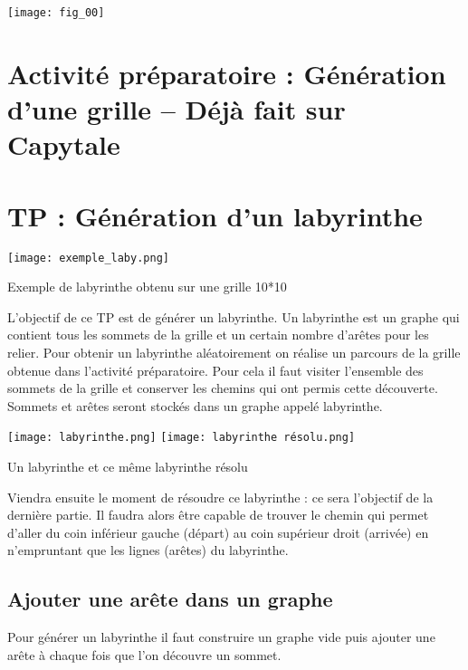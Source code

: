 \begin{marginfigure}
\texttt{[image: fig\_00]}
\end{marginfigure}

\section*{Activité préparatoire : Génération d'une grille -- Déjà fait sur Capytale}


\section*{TP : Génération d'un labyrinthe}

\begin{marginfigure}
\texttt{[image: exemple\_laby.png]}
\caption{Exemple de labyrinthe obtenu sur une grille 10*10}
\end{marginfigure}


L'objectif de ce TP est de générer un labyrinthe. Un labyrinthe est un graphe qui contient tous les sommets de la grille et un certain nombre d'arêtes pour les relier.
Pour obtenir un labyrinthe aléatoirement on réalise un parcours de la grille obtenue dans l'activité préparatoire.
Pour cela il faut visiter l'ensemble des sommets de la grille et conserver les chemins qui ont permis cette découverte. Sommets et arêtes seront stockés dans un graphe appelé labyrinthe.


\begin{marginfigure}\centering
	\texttt{[image: labyrinthe.png]}
            \texttt{[image: labyrinthe résolu.png]}            
\caption{Un labyrinthe et ce même labyrinthe résolu}
\end{marginfigure}


Viendra ensuite le moment de résoudre ce labyrinthe : ce sera l'objectif de la dernière partie. Il faudra alors être capable de trouver le chemin qui permet d'aller du coin inférieur gauche (départ) au coin supérieur droit (arrivée) en n'empruntant que les lignes (arêtes) du labyrinthe. 

\subsection*{Ajouter une arête dans un graphe}
Pour générer un labyrinthe il faut construire un graphe vide puis ajouter une arête à chaque fois que l'on découvre un sommet.



